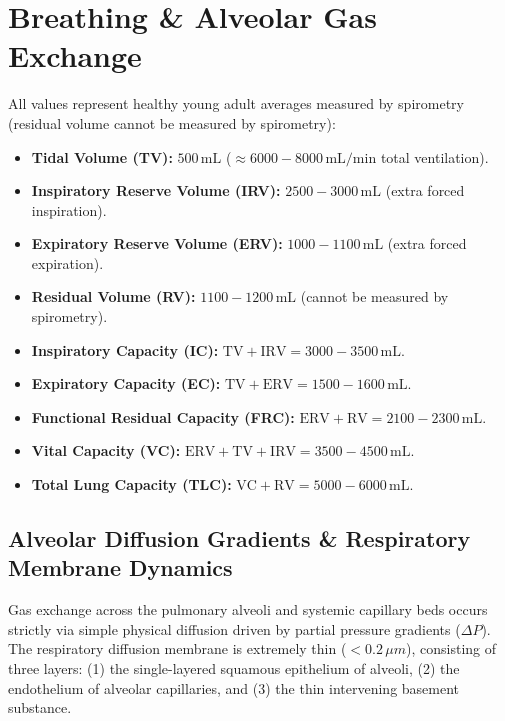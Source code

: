 \documentclass[10pt,twoside,openright]{book}
\begin{document}
\section{Breathing \& Alveolar Gas Exchange}

\begin{formulabox}
All values represent healthy young adult averages measured by spirometry (residual volume cannot be measured by spirometry):
\begin{itemize}[leftmargin=*]
  \item \textbf{Tidal Volume (TV):} $500\,\mathrm{mL}$ ($\approx 6000-8000\,\mathrm{mL/min}$ total ventilation).
  \item \textbf{Inspiratory Reserve Volume (IRV):} $2500-3000\,\mathrm{mL}$ (extra forced inspiration).
  \item \textbf{Expiratory Reserve Volume (ERV):} $1000-1100\,\mathrm{mL}$ (extra forced expiration).
  \item \textbf{Residual Volume (RV):} $1100-1200\,\mathrm{mL}$ (cannot be measured by spirometry).
  \item \textbf{Inspiratory Capacity (IC):} $\mathrm{TV} + \mathrm{IRV} = 3000-3500\,\mathrm{mL}$.
  \item \textbf{Expiratory Capacity (EC):} $\mathrm{TV} + \mathrm{ERV} = 1500-1600\,\mathrm{mL}$.
  \item \textbf{Functional Residual Capacity (FRC):} $\mathrm{ERV} + \mathrm{RV} = 2100-2300\,\mathrm{mL}$.
  \item \textbf{Vital Capacity (VC):} $\mathrm{ERV} + \mathrm{TV} + \mathrm{IRV} = 3500-4500\,\mathrm{mL}$.
  \item \textbf{Total Lung Capacity (TLC):} $\mathrm{VC} + \mathrm{RV} = 5000-6000\,\mathrm{mL}$.
\end{itemize}
\end{formulabox}

\subsection{Alveolar Diffusion Gradients \& Respiratory Membrane Dynamics}
Gas exchange across the pulmonary alveoli and systemic capillary beds occurs strictly via simple physical diffusion driven by partial pressure gradients ($\Delta P$). The respiratory diffusion membrane is extremely thin ($<0.2\,\si{\mu m}$), consisting of three layers: (1) the single-layered squamous epithelium of alveoli, (2) the endothelium of alveolar capillaries, and (3) the thin intervening basement substance.
\end{document}
